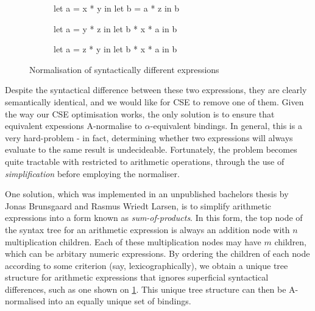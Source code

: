 \begin{figure}
\begin{subfigure}[t]{.33\textwidth}
\centering
\begin{colorcode}
let a = x * y in
let b = a * z in
b
\end{colorcode}
\end{subfigure}%
\begin{subfigure}[t]{.33\textwidth}
\centering
\begin{colorcode}
let a = y * z in
let b * x * a in
b
\end{colorcode}
\end{subfigure}%
\begin{subfigure}[t]{.33\textwidth}
\centering
\begin{colorcode}
let a = z * y in
let b * x * a in
b
\end{colorcode}
\end{subfigure}
\caption{Normalisation of syntactically different expressions}
\label{fig:differing-normalisation}
\end{figure}

Despite the syntactical difference between these two expressions, they
are clearly semantically identical, and we would like for CSE to
remove one of them.  Given the way our CSE optimisation works, the
only solution is to ensure that equivalent expessions A-normalise to
$\alpha$-equivalent bindings.  In general, this is a very hard-problem
- in fact, determining whether two expressions will always evaluate to
the same result is undecideable.
Fortunately, the problem becomes quite tractable with restricted to
arithmetic operations, through the use of \textit{simplification}
before employing the normaliser.

One solution, which was implemented in an unpublished bachelors thesis
by Jonas Brunsgaard and Rasmus Wriedt Larsen, is to simplify
arithmetic expressions into a form known as \textit{sum-of-products}.
In this form, the top node of the syntax tree for an arithmetic
expression is always an addition node with $n$ multiplication
children.  Each of these multiplication nodes may have $m$ children,
which can be arbitary numeric expressions.  By ordering the children
of each node according to some criterion (say, lexicographically), we
obtain a unique tree structure for arithmetic expressions that ignores
superficial syntactical differences, such as one shown on
\cref{fig:differing-normalisation}.  This unique tree structure can
then be A-normalised into an equally unique set of bindings.

